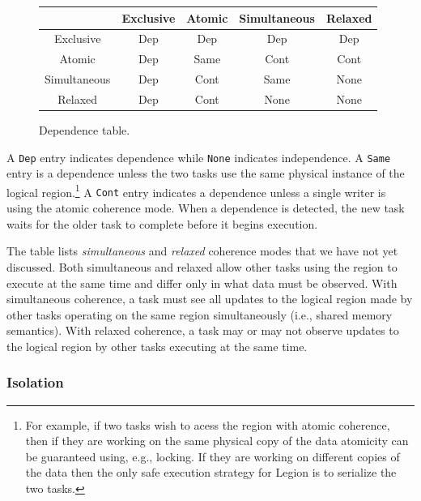 \begin{figure}
{\small
\begin{tabular}{c|cccc}
             & Exclusive & Atomic   & Simultaneous & Relaxed \\
\midrule
Exclusive    & Dep & Dep & Dep & Dep \\ 
Atomic       & Dep & Same & Cont & Cont \\
Simultaneous & Dep & Cont & Same & None \\
Relaxed      & Dep & Cont & None & None \\
\end{tabular}
}
\caption{Dependence table.}
\label{fig:dependence}
\end{figure}
A {\tt Dep} entry indicates dependence while {\tt None}
indicates independence.  A {\tt Same} entry is a dependence unless the two tasks
use the same physical instance of the logical region.\footnote{For example, if two tasks wish to acess the region with atomic coherence, then if they are working on the same physical copy of the data atomicity can be guaranteed using, e.g., locking.  If they are working on different copies of the data then the only safe execution strategy for Legion is to serialize the two tasks.}
A {\tt Cont} entry
indicates a dependence unless a single writer is using the
atomic coherence mode.  When a dependence is detected, the new task
waits for the older task to complete before it begins execution.

The table lists {\em simultaneous} and {\em relaxed} coherence modes
that we have not yet discussed.  Both simultaneous and relaxed
allow other tasks using the region to execute at the same time and differ
only in what data must be observed.  With simultaneous coherence, a task must 
see all updates to the logical region made by other tasks operating on the same region 
simultaneously (i.e., shared memory semantics).  With relaxed coherence, 
a task may or may not observe updates to the logical region by other tasks executing at
the same time.


\subsubsection{Isolation}

%
%
%
%
%
%
%

